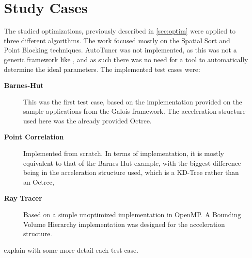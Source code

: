 \section{Study Cases}
\label{sec:cases}

The studied optimizations, previously described in \cref{sec:optim} were applied to three different algorithms. The work focused mostly on the Spatial Sort and Point Blocking techniques. AutoTuner was not implemented, as this was not a generic framework like \treetiler, and as such there was no need for a tool to automatically determine the ideal parameters. The implemented test cases were:

\begin{description}
	\item[\textbf{Barnes-Hut}]
		This was the first test case, based on the implementation provided on the sample applications from the Galois framework. The acceleration structure used here was the already provided Octree.

	\item[\textbf{Point Correlation}]
		Implemented from scratch. In terms of implementation, it is mostly equivalent to that of the Barnes-Hut example, with the biggest difference being in the acceleration structure used, which is a KD-Tree rather than an Octree,

	\item[\textbf{Ray Tracer}]
		Based on a simple unoptimized implementation in OpenMP. A Bounding Volume Hierarchy implementation was designed for the acceleration structure.
\end{description}

 explain with some more detail each test case.



